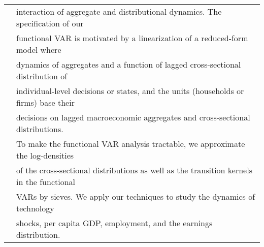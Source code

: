 \documentclass[letterpaper,11pt,oneside]{article}
\begin{document}
\begin{tabular}{@{} l l}
 & interaction of aggregate and distributional dynamics. The specification of our\\
 & functional VAR is motivated by a linearization of a reduced-form model where\\
 & dynamics of aggregates and a function of lagged cross-sectional distribution of\\ & individual-level decisions or states, and the units (households or firms) base their\\ & decisions on lagged macroeconomic aggregates and cross-sectional distributions.\\ & To make the functional VAR analysis tractable, we approximate the log-densities\\ & of the cross-sectional distributions as well as the transition kernels in the functional\\ 
 & VARs by sieves. We apply our techniques to study the dynamics of technology\\ & shocks, per capita GDP, employment, and the earnings distribution.\\[0.1in]
   \end{tabular}\\
\end{document}
